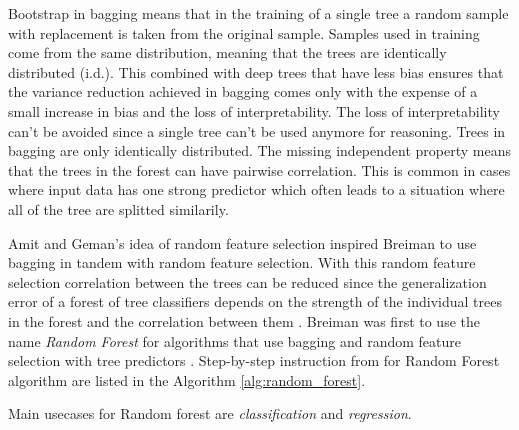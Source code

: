 Bootstrap in bagging means that in the training of a single tree a random sample with replacement is taken from the original sample. Samples used in training come from the same distribution, meaning that the trees are identically distributed (i.d.). This combined with deep trees that have less bias ensures that the variance reduction achieved in bagging comes only with the expense of a small increase in bias and the loss of interpretability. The loss of interpretability can't be avoided since a single tree can't be used anymore for reasoning. Trees in bagging are only identically distributed. The missing independent property means that the trees in the forest can have pairwise correlation. This is common in cases where input data has one strong predictor which often leads to a situation where all of the tree are splitted similarily. \cite{friedman2001elements}

Amit and Geman's \cite{amit1997shape} idea of random feature selection inspired Breiman to use bagging in tandem with random feature selection. With this random feature selection correlation between the trees can be reduced since the generalization error of a forest of tree classifiers depends on the strength of the individual trees in the forest and the correlation between them \cite{breiman2001random}. Breiman was first to use the name \textit{Random Forest} for algorithms that use bagging and random feature selection with tree predictors \cite{breiman2001random}. Step-by-step instruction from \cite{friedman2001elements} for Random Forest algorithm are listed in the Algorithm \ref{alg:random_forest}.

Main usecases for Random forest are \textit{classification} and \textit{regression}.

